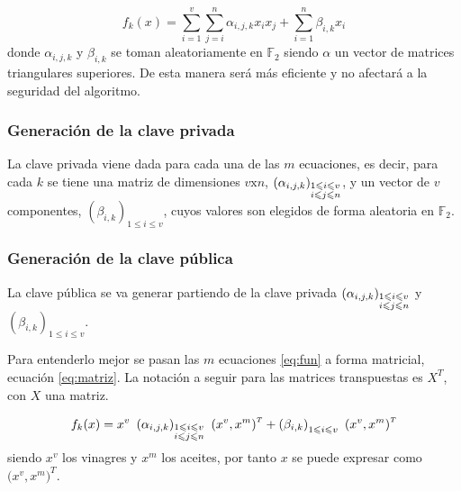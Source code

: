\begin{equation}\label{eq:fun}
f_k(x) = \sum_{i=1}^v \sum_{j=i}^n \alpha_{i,j,k} x_i x_j + \sum_{i=1}^n \beta_{i,k} x_i
\end{equation}
donde $\alpha_{i,j,k}$ y $\beta_{i,k}$ se toman aleatoriamente en $\mathds{F}_2$ siendo $\alpha$ un vector de matrices triangulares superiores. De esta manera será más eficiente y no afectará a la seguridad del algoritmo.



\subsubsection{Generación de la clave privada}
La clave privada viene dada para cada una de las $m$ ecuaciones, es decir, para cada $k$ se tiene una matriz de dimensiones $v \mathrm{x} n$, $\left(\alpha_{i,j,k}\right)_{\begin{subarray}{l}{1\leqslant i \leqslant v }\\ {i \leqslant j \leqslant n}\end{subarray}}$, y un vector de $v$ componentes, $\left(\beta_{i,k}\right)_{1\leqslant i \leqslant v }$, cuyos valores son elegidos de forma aleatoria en $\mathds{F}_2$.


\subsubsection{Generación de la clave pública}
La clave pública se va generar partiendo de la clave privada $\left(\alpha_{i,j,k}\right)_{\begin{subarray}{l}{1\leqslant i \leqslant v }\\ {i \leqslant j \leqslant n}\end{subarray}}$ y $\left(\beta_{i,k}\right)_{1\leqslant i \leqslant v }$.

Para entenderlo mejor se pasan las $m$ ecuaciones \ref{eq:fun} a forma matricial, ecuación \ref{eq:matriz}. La notación a seguir para las matrices transpuestas es $X^{\scriptscriptstyle T}$, con $X$ una matriz.

\begin{equation}\label{eq:matriz} 
	f_k(x) = x^v\ \left(\alpha_{i,j,k}\right)_{\begin{subarray}{l}{1\leqslant i \leqslant v }\\ {i \leqslant j \leqslant n}\end{subarray}}\ \left(x^v, x^m \right)^{\scriptscriptstyle T} + \left(\beta_{i,k}\right)_{1\leqslant i \leqslant v }\ \left(x^v, x^m\right)^{\scriptscriptstyle T}
\end{equation}
siendo $x^v$ los vinagres y $x^m$ los aceites, por tanto $x$ se puede expresar como $\big(x^v, x^m\big)^{\scriptscriptstyle T}$.\\


